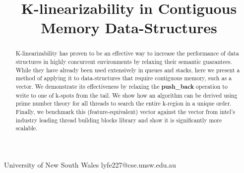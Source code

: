 \documentclass{sigplanconf}
\begin{document}
\setlength{\pdfpageheight}{\paperheight}
\setlength{\pdfpagewidth}{\paperwidth}






\title{K-linearizability in Contiguous Memory Data-Structures}

           {University of New South Wales}
           {lyfe227@cse.unsw.edu.au}

\maketitle

\newcommand{\op}{\textbf}

\begin{abstract}
K-linearizability has proven to be an effective way to increase the performance
of data structures in highly concurrent environments by relaxing their
semantic guarantees. While they have already been used extensively
in queues and stacks, here we present a method of applying it to data-structures
that require contiguous memory, such as a vector. We demonstrate
its effectiveness by relaxing the \op{push\_back} operation to write
to one of k-spots from the tail. We show how an algorithm can
be derived using prime number theory for all threads to search the
entire k-region in a unique order. Finally, we benchmark this
(feature-equivalent) vector against the vector from intel's
industry leading thread building blocks library and show it is significantly more scalable.
\end{abstract}
\end{document}
